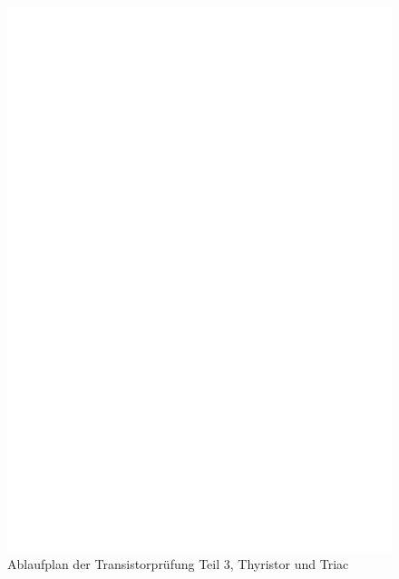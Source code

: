 \begin{figure}[H]
\centering
\includegraphics[]{../FIG/CheckSemi3.eps}
\caption{Ablaufplan der Transistorprüfung Teil 3, Thyristor und Triac}
\label{fig:ChkSemi3}
\end{figure}

